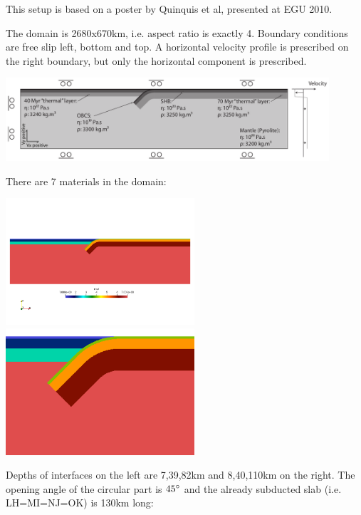 
This setup is based on a poster by Quinquis et al, presented at EGU 2010. 

The domain is 2680x670km, i.e. aspect ratio is exactly 4.
Boundary conditions are free slip left, bottom and top. 
A horizontal velocity profile is prescribed on the right boundary, but 
only the horizontal component is prescribed. 


\begin{center}
\includegraphics[width=12cm]{python_codes/fieldstone_67/images/setup}
\end{center}

There are 7 materials in the domain:
\begin{center}
\includegraphics[width=7cm]{python_codes/fieldstone_67/images/mats}
\includegraphics[width=7cm]{python_codes/fieldstone_67/images/maats}
\end{center}

Depths of interfaces on the left are 7,39,82km and 8,40,110km on the right.
The opening angle of the circular part is $45\degree$ and the 
already subducted slab (i.e. LH=MI=NJ=OK) is 130km long:

